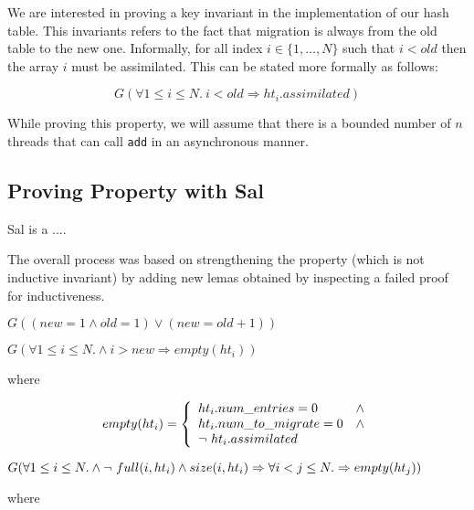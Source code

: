 We are interested in proving a key invariant in the implementation of
our hash table. This invariants refers to the fact that migration is
always from the old table to the new one. Informally, for all index $i
\in \{1, \ldots, N\}$ such that $i < old$ then the array $i$ must be
assimilated. This can be stated more formally as follows:

  \[G(\forall 1 \leq i \leq N.~ i < old \Rightarrow ht_{i}.assimilated) \]
  
While proving this property, we will assume that there is a bounded
number of $n$ threads that can call \texttt{add} in an asynchronous
manner.

\subsection{Proving Property with Sal}

Sal\cite{sal2} is a ....

The overall process was based on strengthening the property (which is
not inductive invariant) by adding new lemas obtained by inspecting a
failed proof for inductiveness.

\begin{lemma}
  $G((new = 1 \wedge old = 1) \vee (new = old+1))$
\end{lemma}

\begin{lemma}
  $G(\forall 1 \leq i \leq N.  \wedge i > new \Rightarrow empty(ht_i))$

  \noindent where

  \begin{equation*}
    empty(ht_i)=\left\{
    \begin{array}{ll}
      ht_i.num\_entries = 0  & \wedge \\
      ht_i.num\_to\_migrate = 0 & \wedge \\
      \mbox{$\neg\ ht_i.assimilated$} & 
    \end{array}
    \right.
  \end{equation*}
  
\end{lemma}  

\begin{lemma}
 $G(\forall 1 \leq i \leq N.  \wedge \mbox{$\neg\ full(i, ht_i)$} \wedge size(i,ht_i) \Rightarrow \\
       \forall i < j \leq N.  \Rightarrow empty(ht_j))$
\end{lemma}  

\noindent where


